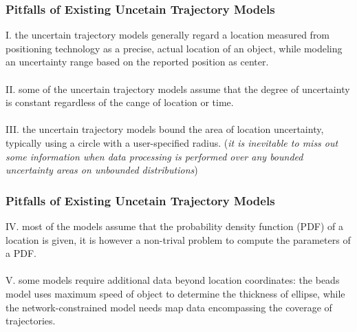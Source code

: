 
\begin{frame}
\frametitle{Pitfalls of Existing Uncetain Trajectory Models}

\textrm{I.} \quad the uncertain trajectory models generally regard a location measured from positioning technology as a precise, actual location of an object, while modeling an uncertainty range based on the reported position as center.\\~\\

\textrm{II.} \quad some of the uncertain trajectory models assume that the degree of uncertainty is constant regardless of the cange of location or time.\\~\\

\textrm{III.} \quad the uncertain trajectory models bound the area of location uncertainty, typically using a circle with a user-specified radius. (\textit{it is inevitable to miss out some information when data processing is performed over any bounded uncertainty areas on unbounded distributions})

\end{frame}


\begin{frame}
\frametitle{Pitfalls of Existing Uncetain Trajectory Models}

\textrm{IV.} \quad most of the models assume that the probability density function (PDF) of a location is given, it is however a non-trival problem to compute the parameters of a PDF. \\~\\

\textrm{V.} \quad some models require additional data beyond location coordinates: the beads model uses maximum speed of object to determine the thickness of ellipse, while the network-constrained model needs map data encompassing the coverage of trajectories.

\end{frame}


